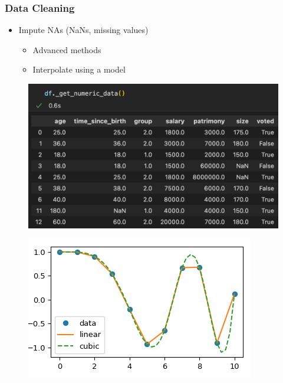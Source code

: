 \begin{frame}\frametitle{Data Cleaning}
   \begin{itemize}
      \item Impute NAs (NaNs, missing values)
      \begin{itemize}
         \item Advanced methods
         \item Interpolate using a model
      \end{itemize}
   \end{itemize}
   \vspace{.5cm}
   \begin{minipage}{0.60\linewidth}
      \begin{figure}[H]
         \includegraphics[scale=.35]{../images/illustrations/data_cleaning_na_imputation_model_1.png}
      \end{figure}
   \end{minipage}
   \begin{minipage}{0.36\linewidth}
      \begin{figure}[H]
         \includegraphics[scale=.45]{../images/illustrations/data_cleaning_na_imputation_interpolate.png}
      \end{figure}
   \end{minipage}
\end{frame}

